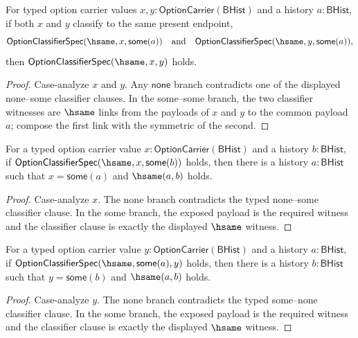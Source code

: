 \begin{theorem}
\label{thm:option-classifier-spec-hsame-common-right-confluence}
For typed option carrier values
$x,y:\mathsf{OptionCarrier}(\mathsf{BHist})$ and a history $a:\mathsf{BHist}$,
if both $x$ and $y$ classify to the same present endpoint,
$$
\mathsf{OptionClassifierSpec}(\hsame,x,\mathsf{some}(a))
\quad\hbox{and}\quad
\mathsf{OptionClassifierSpec}(\hsame,y,\mathsf{some}(a)),
$$
then $\mathsf{OptionClassifierSpec}(\hsame,x,y)$ holds.
\end{theorem}
\begin{proof}
Case-analyze $x$ and $y$. Any $\mathsf{none}$ branch contradicts one of the
displayed none--some classifier clauses. In the some--some branch, the two
classifier witnesses are $\hsame$ links from the payloads of $x$ and $y$ to
the common payload $a$; compose the first link with the symmetric of the
second.
\end{proof}

\begin{theorem}
\label{thm:option-classifier-spec-hsame-some-right-inversion}
For a typed option carrier value $x:\mathsf{OptionCarrier}(\mathsf{BHist})$ and
a history $b:\mathsf{BHist}$, if
$\mathsf{OptionClassifierSpec}(\hsame,x,\mathsf{some}(b))$ holds, then there is
a history $a:\mathsf{BHist}$ such that $x=\mathsf{some}(a)$ and
$\hsame(a,b)$ holds.
\end{theorem}
\begin{proof}
Case-analyze $x$. The none branch contradicts the typed none--some classifier
clause. In the some branch, the exposed payload is the required witness and the
classifier clause is exactly the displayed $\hsame$ witness.
\end{proof}

\begin{theorem}
\label{thm:option-classifier-spec-hsame-some-left-inversion}
For a typed option carrier value $y:\mathsf{OptionCarrier}(\mathsf{BHist})$ and
a history $a:\mathsf{BHist}$, if
$\mathsf{OptionClassifierSpec}(\hsame,\mathsf{some}(a),y)$ holds, then there is
a history $b:\mathsf{BHist}$ such that $y=\mathsf{some}(b)$ and
$\hsame(a,b)$ holds.
\end{theorem}
\begin{proof}
Case-analyze $y$. The none branch contradicts the typed some--none classifier
clause. In the some branch, the exposed payload is the required witness and the
classifier clause is exactly the displayed $\hsame$ witness.
\end{proof}

